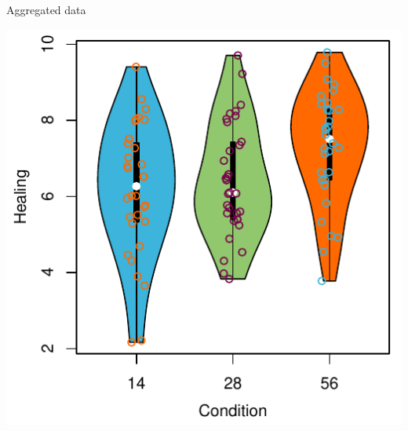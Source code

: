 \documentclass[aspectratio=169]{beamer}
\begin{document}
\begin{frame}{Aggregated data}
  \begin{center}
    \includegraphics[scale=.8]{../figures/heal_vioplot}
  \end{center}
\end{frame}
\end{document}
